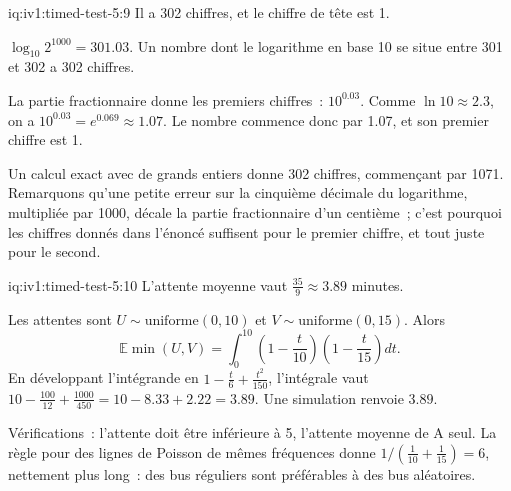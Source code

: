 \begin{solution}{iq:iv1:timed-test-5:9}
Il a 302 chiffres, et le chiffre de tête est 1.

$\log_{10}2^{1000} = 301.03$. Un nombre dont le logarithme en base 10 se situe entre 301 et 302 a 302 chiffres.

La partie fractionnaire donne les premiers chiffres~: $10^{0.03}$. Comme $\ln 10 \approx 2.3$, on a $10^{0.03} = e^{0.069} \approx 1.07$. Le nombre commence donc par 1.07, et son premier chiffre est 1.

Un calcul exact avec de grands entiers donne 302 chiffres, commençant par 1071. Remarquons qu'une petite erreur sur la cinquième décimale du logarithme, multipliée par 1000, décale la partie fractionnaire d'un centième~; c'est pourquoi les chiffres donnés dans l'énoncé suffisent pour le premier chiffre, et tout juste pour le second.

\end{solution}

\begin{solution}{iq:iv1:timed-test-5:10}
L'attente moyenne vaut $\frac{35}{9} \approx 3.89$ minutes.

Les attentes sont $U \sim \text{uniforme}(0, 10)$ et $V \sim \text{uniforme}(0, 15)$. Alors
\[
\mathbb{E}\min(U, V) = \int_0^{10}\left(1 - \frac{t}{10}\right)\left(1 - \frac{t}{15}\right)dt.
\]
En développant l'intégrande en $1 - \frac{t}{6} + \frac{t^2}{150}$, l'intégrale vaut $10 - \frac{100}{12} + \frac{1000}{450} = 10 - 8.33 + 2.22 = 3.89$. Une simulation renvoie $3.89$.

Vérifications~: l'attente doit être inférieure à 5, l'attente moyenne de A seul. La règle pour des lignes de Poisson de mêmes fréquences donne $1/(\frac{1}{10} + \frac{1}{15}) = 6$, nettement plus long~: des bus réguliers sont préférables à des bus aléatoires.

\end{solution}

